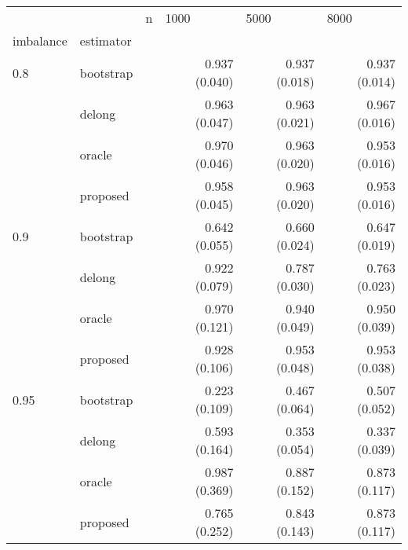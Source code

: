 \begin{tabular}{lll |rrr}
  \hline
           &           & n & \multicolumn{1}{l}{          1000} & \multicolumn{1}{l}{          5000} & \multicolumn{1}{l}{          8000} \\ 
  imbalance & estimator &   & \multicolumn{1}{l}{              } & \multicolumn{1}{l}{              } & \multicolumn{1}{l}{              } \\ 
   \hline
0.8       & bootstrap &   & 0.937 (0.040) & 0.937 (0.018) & 0.937 (0.014) \\ 
            & delong    &   & 0.963 (0.047) & 0.963 (0.021) & 0.967 (0.016) \\ 
            & oracle    &   & 0.970 (0.046) & 0.963 (0.020) & 0.953 (0.016) \\ 
            & proposed  &   & 0.958 (0.045) & 0.963 (0.020) & 0.953 (0.016) \\ 
  0.9       & bootstrap &   & 0.642 (0.055) & 0.660 (0.024) & 0.647 (0.019) \\ 
            & delong    &   & 0.922 (0.079) & 0.787 (0.030) & 0.763 (0.023) \\ 
            & oracle    &   & 0.970 (0.121) & 0.940 (0.049) & 0.950 (0.039) \\ 
            & proposed  &   & 0.928 (0.106) & 0.953 (0.048) & 0.953 (0.038) \\ 
  0.95      & bootstrap &   & 0.223 (0.109) & 0.467 (0.064) & 0.507 (0.052) \\ 
            & delong    &   & 0.593 (0.164) & 0.353 (0.054) & 0.337 (0.039) \\ 
            & oracle    &   & 0.987 (0.369) & 0.887 (0.152) & 0.873 (0.117) \\ 
            & proposed  &   & 0.765 (0.252) & 0.843 (0.143) & 0.873 (0.117) \\ 
   \hline
\end{tabular}
